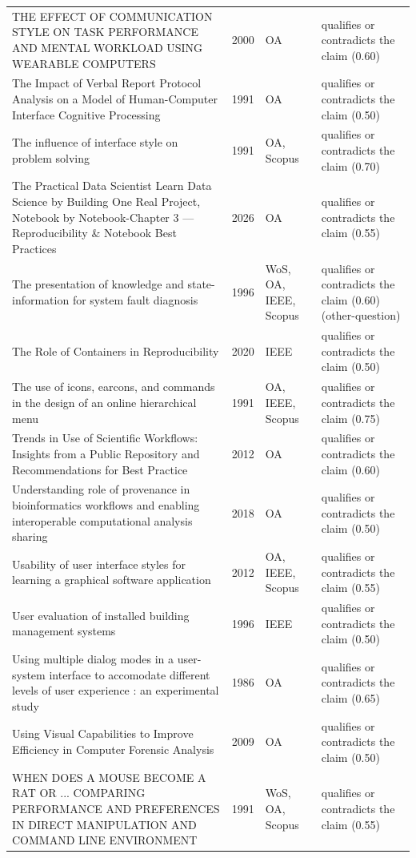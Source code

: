 \begin{longtable}{@{}%
  >{\raggedright\arraybackslash}p{}c%
  >{\raggedright\arraybackslash}p{}%
  >{\raggedright\arraybackslash}p{}@{}}
THE EFFECT OF COMMUNICATION STYLE ON TASK PERFORMANCE AND MENTAL WORKLOAD USING WEARABLE COMPUTERS & 2000 & OA & qualifies or contradicts the claim (0.60) \\
The Impact of Verbal Report Protocol Analysis on a Model of Human-Computer Interface Cognitive Processing & 1991 & OA & qualifies or contradicts the claim (0.50) \\
The influence of interface style on problem solving & 1991 & OA, Scopus & qualifies or contradicts the claim (0.70) \\
The Practical Data Scientist Learn Data Science by Building One Real Project, Notebook by Notebook-Chapter 3 --- Reproducibility \& Notebook Best Practices & 2026 & OA & qualifies or contradicts the claim (0.55) \\
The presentation of knowledge and state-information for system fault diagnosis & 1996 & WoS, OA, IEEE, Scopus & qualifies or contradicts the claim (0.60) (other-question) \\
The Role of Containers in Reproducibility & 2020 & IEEE & qualifies or contradicts the claim (0.50) \\
The use of icons, earcons, and commands in the design of an online hierarchical menu & 1991 & OA, IEEE, Scopus & qualifies or contradicts the claim (0.75) \\
Trends in Use of Scientific Workflows: Insights from a Public Repository and Recommendations for Best Practice & 2012 & OA & qualifies or contradicts the claim (0.60) \\
Understanding role of provenance in bioinformatics workflows and enabling interoperable computational analysis sharing & 2018 & OA & qualifies or contradicts the claim (0.50) \\
Usability of user interface styles for learning a graphical software application & 2012 & OA, IEEE, Scopus & qualifies or contradicts the claim (0.55) \\
User evaluation of installed building management systems & 1996 & IEEE & qualifies or contradicts the claim (0.50) \\
Using multiple dialog modes in a user-system interface to accomodate different levels of user experience : an experimental study & 1986 & OA & qualifies or contradicts the claim (0.65) \\
Using Visual Capabilities to Improve Efficiency in Computer Forensic Analysis & 2009 & OA & qualifies or contradicts the claim (0.50) \\
WHEN DOES A MOUSE BECOME A RAT OR ... COMPARING PERFORMANCE AND PREFERENCES IN DIRECT MANIPULATION AND COMMAND LINE ENVIRONMENT & 1991 & WoS, OA, Scopus & qualifies or contradicts the claim (0.55) \\
\end{longtable}
\endgroup

